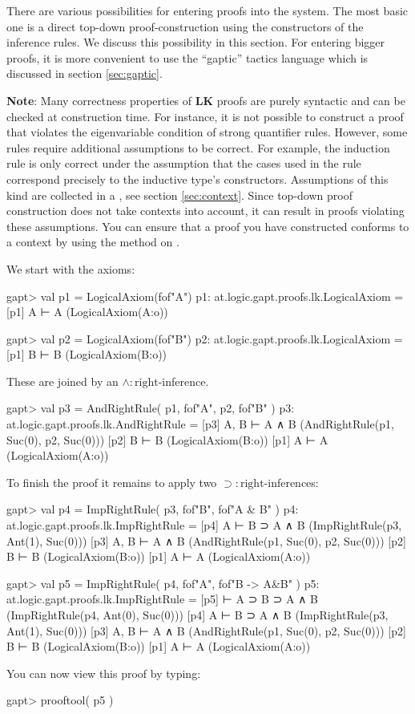 \documentclass[a4paper,11pt]{article}
\newcommand{\impl}{\supset} %
\renewcommand{\land}{\wedge}
\newcommand{\LK}{\textbf{LK}}
\newcommand{\cli}[1]{{\ttfamily {#1}}}
\begin{document}
There are various possibilities for entering proofs into the system. The most
basic one is a direct top-down proof-construction using the constructors
of the inference rules. We discuss this possibility in this section. For
entering bigger proofs, it is more convenient to use the ``gaptic'' tactics
language which is discussed in section \ref{sec:gaptic}.

\textbf{Note}: Many correctness properties of \LK{} proofs are purely syntactic 
and can be checked at construction time. For instance, it is not
possible to construct a proof that violates the eigenvariable condition
of strong quantifier rules. However, some rules require additional
assumptions to be correct. For example, the induction rule is only
correct under the assumption that the cases used in the rule
correspond precisely to the inductive type's constructors. Assumptions
of this kind are collected in a \cli{Context}, see section \ref{sec:context}.
Since top-down proof construction does not take contexts into account,
it can result in proofs violating these assumptions. You can ensure that
a proof you have constructed conforms to a context \cli{ctx} by using the
\cli{check} method on \cli{ctx}.

We start with the axioms:
%
\begin{clilisting}
gapt> val p1 = LogicalAxiom(fof"A")
p1: at.logic.gapt.proofs.lk.LogicalAxiom =
[p1] A ⊢ A    (LogicalAxiom(A:o))

gapt> val p2 = LogicalAxiom(fof"B")
p2: at.logic.gapt.proofs.lk.LogicalAxiom =
[p1] B ⊢ B    (LogicalAxiom(B:o))

\end{clilisting}
%
These are joined by an $\land:\mathrm{right}$-inference.
\begin{clilisting}
gapt> val p3 = AndRightRule( p1, fof"A", p2, fof"B" )
p3: at.logic.gapt.proofs.lk.AndRightRule =
[p3] A, B ⊢ A ∧ B    (AndRightRule(p1, Suc(0), p2, Suc(0)))
[p2] B ⊢ B    (LogicalAxiom(B:o))
[p1] A ⊢ A    (LogicalAxiom(A:o))

\end{clilisting}
%
To finish the proof it remains to apply two $\impl:\mathrm{right}$-inferences:
%
\begin{clilisting}
gapt> val p4 = ImpRightRule( p3, fof"B", fof"A & B" )
p4: at.logic.gapt.proofs.lk.ImpRightRule =
[p4] A ⊢ B ⊃ A ∧ B    (ImpRightRule(p3, Ant(1), Suc(0)))
[p3] A, B ⊢ A ∧ B    (AndRightRule(p1, Suc(0), p2, Suc(0)))
[p2] B ⊢ B    (LogicalAxiom(B:o))
[p1] A ⊢ A    (LogicalAxiom(A:o))

gapt> val p5 = ImpRightRule( p4, fof"A", fof"B -> A&B" )
p5: at.logic.gapt.proofs.lk.ImpRightRule =
[p5]  ⊢ A ⊃ B ⊃ A ∧ B    (ImpRightRule(p4, Ant(0), Suc(0)))
[p4] A ⊢ B ⊃ A ∧ B    (ImpRightRule(p3, Ant(1), Suc(0)))
[p3] A, B ⊢ A ∧ B    (AndRightRule(p1, Suc(0), p2, Suc(0)))
[p2] B ⊢ B    (LogicalAxiom(B:o))
[p1] A ⊢ A    (LogicalAxiom(A:o))

\end{clilisting}
%
You can now view this proof by typing:
\begin{clilisting}
gapt> prooftool( p5 )

\end{clilisting}
\end{document}
